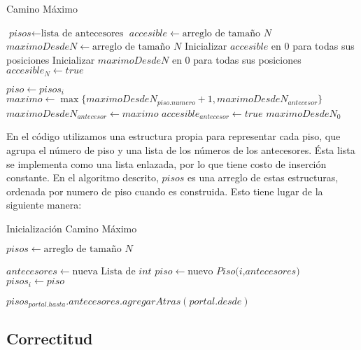 \begin{algorithm}
\caption{Camino Máximo}\label{alg-ej1}
\begin{algorithmic}[1]
\State $\textit{pisos} \gets \text{lista de antecesores}$
\State $\textit{accesible} \gets \text{arreglo de tamaño }N$
\State $\textit{maximoDesdeN} \gets \text{arreglo de tamaño }N$
\State Inicializar $accesible$ en 0 para todas sus posiciones
\State Inicializar $maximoDesdeN$ en 0 para todas sus posiciones
\State $accesible_N \gets true $ 

\State $piso \gets pisos_i$
\State $maximo \gets\max\{maximoDesdeN_{piso.numero} + 1 , maximoDesdeN_{antecesor}\}$
\State $maximoDesdeN_{antecesor} \gets maximo$
\State $accesible_{antecesor} \gets true$
\EndFor
\EndIf
\EndFor  
\Return $maximoDesdeN_{0}$
\EndProcedure
\end{algorithmic}
\end{algorithm}

En el código utilizamos una estructura propia para representar cada piso, que agrupa el número de piso y una lista de los números de los antecesores. Ésta lista se implementa como una lista enlazada, por lo que tiene costo de inserción constante. En el algoritmo descrito, $pisos$ es una arreglo de estas estructuras, ordenada por numero de piso cuando es construida. Esto tiene lugar de la siguiente manera: 

\begin{algorithm}
\caption{Inicialización Camino Máximo}\label{init-ej1}
\begin{algorithmic}[2]
\State $\textit{pisos} \gets \text{arreglo de tamaño }N$

\State $antecesores \gets \text{nueva Lista de }int$
\State $piso \gets \text{nuevo }\textit{Piso(i,antecesores) }$
\State $pisos_i \gets piso $
\EndFor  

\State $pisos_{portal.hasta}.antecesores.agregarAtras( portal.desde )$
\EndFor

\EndProcedure
\end{algorithmic}
\end{algorithm}



\subsection{Correctitud}

